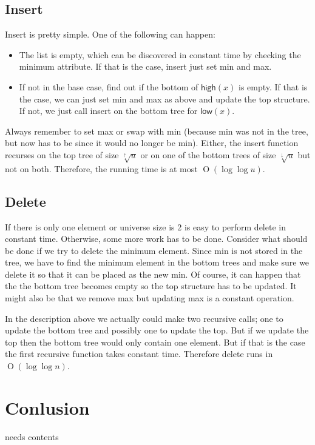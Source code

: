 \documentclass[oneside,11pt,openright]{report}
\newcommand{\BigO}[1]{\ensuremath{\operatorname{O}\left(#1\right)}}
\newcommand{\HIGH}{\textsf{high}}
\newcommand{\LOW}{\textsf{low}}
\newcommand{\HIGHER}{\sqrt[\uparrow]{u}}
\newcommand{\LOWER}{\sqrt[\downarrow]{u}}
\begin{document}
\section{Insert}

Insert is pretty simple. One of the following can happen:

\begin{itemize}
\item The list is empty, which can be discovered in constant time by checking the minimum attribute. If that is the case, insert just set min and max.
\item If not in the base case, find out if the bottom of $\HIGH(x)$ is empty. If that is the case, we can just set min and max as above and update the top structure. If not, we just call insert on the bottom tree for $\LOW(x)$.
\end{itemize}

Always remember to set max or swap with min (because min was not in the tree, but now has to be since it would no longer be min). Either, the insert function recurses on the top tree of size $\HIGHER$ or on one of the bottom trees of size $\LOWER$ but not on both. Therefore, the running time is at most $\BigO{\log \log u}$.

\section{Delete}

If there is only one element or universe size is 2 is easy to perform delete in constant time. Otherwise, some more work has to be done. Consider what should be done if we try to delete the minimum element. Since min is not stored in the tree, we have to find the minimum element in the bottom trees and make sure we delete it so that it can be placed as the new min. Of course, it can happen that the the bottom tree becomes empty so the top structure has to be updated. It might also be that we remove max but updating max is a constant operation.

In the description above we actually could make two recursive calls; one to update the bottom tree and possibly one to update the top. But if we update the top then the bottom tree would only contain one element. But if that is the case the first recursive function takes constant time. Therefore delete runs in $\BigO{\log \log n}$.

\chapter{Conlusion}

needs contents



 

\end{document}
